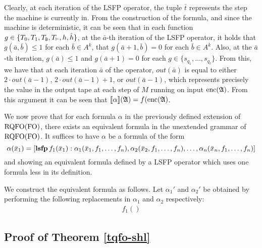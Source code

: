 Clearly, at each iteration of the LSFP operator, the tuple $\bar{t}$ represents the step the machine is currently in. From the construction of the formula, and since the machine is deterministic, it can be seen that in each function $g\in\{T_0,T_1,T_{\mathtt{B}},T_{\vdash},h,\hat{h}\}$, at the $\bar{a}$-th iteration of the LSFP operator, it holds that $g(\bar{a},\bar{b}) \leq 1$ for each $\bar{b}\in A^k$, that $g(\bar{a}+1,\bar{b}) = 0$ for each $\bar{b}\in A^k$. Also, at the $\bar{a}$-th iteration, $g(\bar{a}) \leq 1$ and $g(\bar{a}+1) = 0$ for each $g\in\{s_{q_1},\ldots,s_{q_{\ell}}\}$. From this, we have that at each iteration $\bar{a}$ of the operator, $out(\bar{a})$ is equal to either $2\cdot out(\bar{a}-1)$, $2\cdot out(\bar{a}-1) + 1$, or $out(\bar{a}-1)$, which represents precisely the value in the output tape at each step of $M$ running on input ${\rm enc}(\mathfrak{A})$. From this argument it can be seen that ${\llbracket{}{\alpha}\rrbracket}(\mathfrak{A}) = f({\rm enc}(\mathfrak{A})$.

\vspace{1em}
We now prove that for each formula $\alpha$ in the previously defined extension of ${\rm RQFO}({\rm FO})$, there exists an equivalent formula in the unextended grammar of ${\rm RQFO}({\rm FO})$. It suffices to have $\alpha$ be a formula of the form 
$$
\alpha(\bar{x}_1) = [{\bf lsfp} \, f_1(\bar{x}_1): \alpha_1(\bar{x}_1,f_1,\ldots,f_n),\alpha_2(\bar{x}_2,f_1,\ldots,f_n),\ldots,\alpha_n(\bar{x}_n,f_1,\ldots,f_n)]
$$
and showing an equivalent formula defined by a LSFP operator which uses one formula less in its definition.

We construct the equivalent formula as follows. Let $\alpha_1'$ and $\alpha_2'$ be obtained by performing the following replacements in $\alpha_1$ and $\alpha_2$ respectively:
\begin{align*}
f_1()
\end{align*}

\subsection*{Proof of Theorem \ref{tqfo-shl}}

